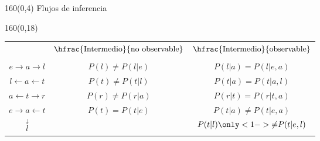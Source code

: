 \documentclass[shownotes,aspectratio=169]{beamer}
\begin{document}
\begin{frame}[plain]
\begin{textblock}{160}(0,4)
\centering \Large Flujos de inferencia
\end{textblock}

\begin{textblock}{160}(0,18)
\centering
 \begin{tabular}{c c|c}
 & $\hfrac{\text{Intermedio}}{\text{no observable}}$ &   $\hfrac{\text{Intermedio}}{\text{observable}}$ \\
 & & \\
 $ e \rightarrow a \rightarrow l $    & $P(l) \neq P(l|e)$ & $P(l|a) \overset{\phantom{?}}{=} P(l|e,a)$ \\ 
 $ l \leftarrow a \leftarrow t $      &  $P(t) \neq P(t|l)$  & $P(t|a) \overset{\phantom{?}}{=} P(t|a,l)$ \\ 
 $ a \leftarrow t \rightarrow r $     & $P(r) \neq P(r|a)$ & $P(r|t) \overset{\phantom{?}}{=} P(r|t,a)$ \\
 $ e \rightarrow a \leftarrow t $     & $P(t) \overset{\phantom{?}}{=}  P(t|e)$ & $P(t|a) \neq P(t|e,a)$ \\
            $\overset{\downarrow}{l}$  & \phantom{$P(t) \overset{?}{=}  P(t|e)$} & $P(t|l) \only<1->{\neq} P(t|e,l)$
 \end{tabular} 
 \end{textblock}

 
 
\end{frame}
% 
% 
%  
% 
\end{document}
